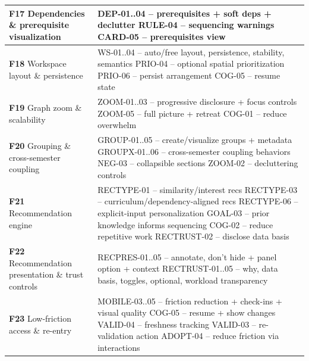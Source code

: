 \begin{longtable}{p{4.5cm} p{10cm}}
\textbf{F17} Dependencies \& prerequisite visualization &
DEP-01..04 -- prerequisites + soft deps + declutter \newline
RULE-04 -- sequencing warnings \newline
CARD-05 -- prerequisites view \\
\midrule

\textbf{F18} Workspace layout \& persistence &
WS-01..04 -- auto/free layout, persistence, stability, semantics \newline
PRIO-04 -- optional spatial prioritization \newline
PRIO-06 -- persist arrangement \newline
COG-05 -- resume state \\
\midrule

\textbf{F19} Graph zoom \& scalability &
ZOOM-01..03 -- progressive disclosure + focus controls \newline
ZOOM-05 -- full picture + retreat \newline
COG-01 -- reduce overwhelm \\
\midrule

\textbf{F20} Grouping \& cross-semester coupling &
GROUP-01..05 -- create/visualize groups + metadata \newline
GROUPX-01..06 -- cross-semester coupling behaviors \newline
NEG-03 -- collapsible sections \newline
ZOOM-02 -- decluttering controls \\
\midrule

\textbf{F21} Recommendation engine &
RECTYPE-01 -- similarity/interest recs \newline
RECTYPE-03 -- curriculum/dependency-aligned recs \newline
RECTYPE-06 -- explicit-input personalization \newline
GOAL-03 -- prior knowledge informs sequencing \newline
COG-02 -- reduce repetitive work \newline
RECTRUST-02 -- disclose data basis \\
\midrule

\textbf{F22} Recommendation presentation \& trust controls &
RECPRES-01..05 -- annotate, don't hide + panel option + context \newline
RECTRUST-01..05 -- why, data basis, toggles, optional, workload transparency \\
\midrule

\textbf{F23} Low-friction access \& re-entry &
MOBILE-03..05 -- friction reduction + check-ins + visual quality \newline
COG-05 -- resume + show changes \newline
VALID-04 -- freshness tracking \newline
VALID-03 -- re-validation action \newline
ADOPT-04 -- reduce friction via interactions \\
\midrule


\end{longtable}
